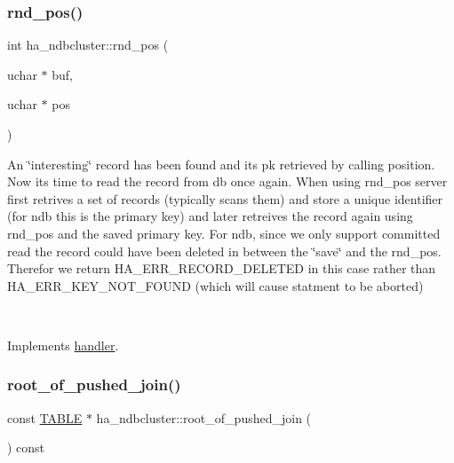 \subsubsection{\texorpdfstring{rnd\+\_\+pos()}{rnd\_pos()}}
{\footnotesize\ttfamily int ha\+\_\+ndbcluster\+::rnd\+\_\+pos (\begin{DoxyParamCaption}\item[{uchar $\ast$}]{buf,  }\item[{uchar $\ast$}]{pos }\end{DoxyParamCaption})\hspace{0.3cm}{\ttfamily [virtual]}}

An \char`\"{}interesting\char`\"{} record has been found and it\textquotesingle{}s pk retrieved by calling position. Now it\textquotesingle{}s time to read the record from db once again. When using rnd\+\_\+pos server first retrives a set of records (typically scans them) and store a unique identifier (for ndb this is the primary key) and later retreives the record again using rnd\+\_\+pos and the saved primary key. For ndb, since we only support committed read the record could have been deleted in between the \char`\"{}save\char`\"{} and the rnd\+\_\+pos. Therefor we return H\+A\+\_\+\+E\+R\+R\+\_\+\+R\+E\+C\+O\+R\+D\+\_\+\+D\+E\+L\+E\+T\+ED in this case rather than H\+A\+\_\+\+E\+R\+R\+\_\+\+K\+E\+Y\+\_\+\+N\+O\+T\+\_\+\+F\+O\+U\+ND (which will cause statment to be aborted)

~\newline
 

Implements \mbox{\hyperlink{classhandler_adf659edd9d870e90c8974ae0eba7a082}{handler}}.

\mbox{\label{classha__ndbcluster_abf2a5948eca40262f5d533d7c57ca414}} 
\subsubsection{\texorpdfstring{root\+\_\+of\+\_\+pushed\+\_\+join()}{root\_of\_pushed\_join()}}
{\footnotesize\ttfamily const \mbox{\hyperlink{structTABLE}{T\+A\+B\+LE}} $\ast$ ha\+\_\+ndbcluster\+::root\+\_\+of\+\_\+pushed\+\_\+join (\begin{DoxyParamCaption}{ }\end{DoxyParamCaption}) const\hspace{0.3cm}{\ttfamily [virtual]}}

